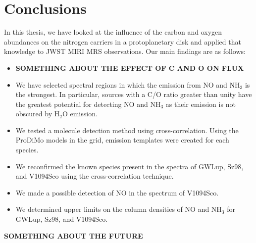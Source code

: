 \documentclass[oneside, single, authoryear, semicolon, 12pt]{lion-msc}
\newcommand{\4}{$_4$}
\newcommand{\3}{$_3$}
\newcommand{\2}{$_2$}
\begin{document}
\chapter{Conclusions}\label{Ch: Conclusions}
In this thesis, we have looked at the influence of the carbon and oxygen abundances on the nitrogen carriers in a protoplanetary disk and applied that knowledge to JWST MIRI MRS observations. Our main findings are as follows:
\begin{itemize}
    \item \textbf{SOMETHING ABOUT THE EFFECT OF C AND O ON FLUX}
    \item We have selected spectral regions in which the emission from NO and NH\3 is the strongest. In particular, sources with a C/O ratio greater than unity have the greatest potential for detecting NO and NH\3 as their emission is not obscured by H\2O emission.
    \item We tested a molecule detection method using cross-correlation. Using the ProDiMo models in the grid, emission templates were created for each species. 
    \item We reconfirmed the known species present in the spectra of GWLup, Sz98, and V1094Sco using the cross-correlation technique.
    \item We made a possible detection of NO in the spectrum of V1094Sco.
    \item We determined upper limits on the column densities of NO and NH\3 for GWLup, Sz98, and V1094Sco.
\end{itemize}
\textbf{SOMETHING ABOUT THE FUTURE}






\appendix
\end{document}
